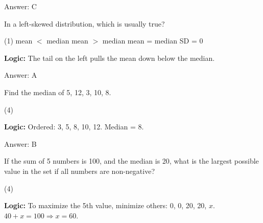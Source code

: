 \documentclass[11pt,paper=a4,answers]{exam}
\begin{document}
\begin{questions}
\begin{solution}
\vspace{30pt}

Answer: \colorbox{yellow!100}{C}
\end{solution}

\vspace{60pt}

\question
In a left-skewed distribution, which is usually true?
\begin{tasks}(1)
    \task mean $<$ median
    \task mean $>$ median
    \task mean = median
    \task SD = 0
\end{tasks}

\begin{solution}
\textbf{Logic:} The tail on the left pulls the mean down below the median.


\vspace{30pt}

Answer: \colorbox{yellow!100}{A}
\end{solution}

\vspace{60pt}

\question
Find the median of {5, 12, 3, 10, 8}.
\begin{tasks}(4)
\end{tasks}

\begin{solution}
\textbf{Logic:} Ordered: 3, 5, 8, 10, 12. Median = 8.

\vspace{30pt}

Answer: \colorbox{yellow!100}{B}
\end{solution}

\vspace{60pt}

\question
If the sum of 5 numbers is 100, and the median is 20, what is the largest possible value in the set if all numbers are non-negative?
\begin{tasks}(4)
\end{tasks}

\begin{solution}
\textbf{Logic:} To maximize the 5th value, minimize others: 0, 0, 20, 20, $x$. $40 + x = 100 \Rightarrow x = 60$.


\end{solution}
\end{questions}
\end{document}
